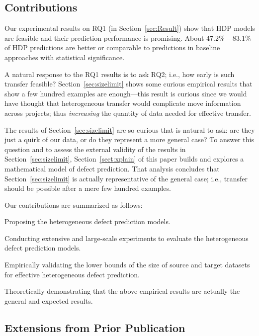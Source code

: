 \subsection{Contributions}
Our experimental results on RQ1 (in Section~\ref{sec:Result}) show that HDP models are feasible and their prediction
performance is promising. About 47.2\% -- 83.1\% of HDP predictions
are better or comparable to predictions in baseline approaches with statistical
significance.

A natural response to the RQ1 results is to ask RQ2; i.e., how early is such transfer
feasible?  Section~\ref{sec:sizelimit} shows some curious empirical results  that show a few hundred examples are enough---this result is curious since we would have thought that
heterogeneous transfer would complicate move information across projects;
thus {\em increasing} the quantity of data needed for effective transfer.

The results of Section~\ref{sec:sizelimit} are so curious that is natural to ask: are they just a quirk of our data, or do they represent a more general case? To answer this question and to assess the external validity of the results in Section~\ref{sec:sizelimit}, Section~\ref{sect:xplain} of this paper builds and explores a mathematical model of defect prediction.
That analysis concludes that Section~\ref{sec:sizelimit} is actually representative of the general case; i.e., transfer should be possible after a mere few hundred examples.



Our contributions are summarized as follows:
\squishlist
  \item Proposing the heterogeneous defect prediction models.
  \item Conducting extensive and large-scale experiments to evaluate
  the heterogeneous defect prediction models.
  \item Empirically validating the lower bounds of the size of source and target datasets for effective heterogeneous defect prediction.
  \item Theoretically demonstrating that the above empirical results are actually
  the general and expected results.
\squishend


\subsection{Extensions from Prior Publication}

